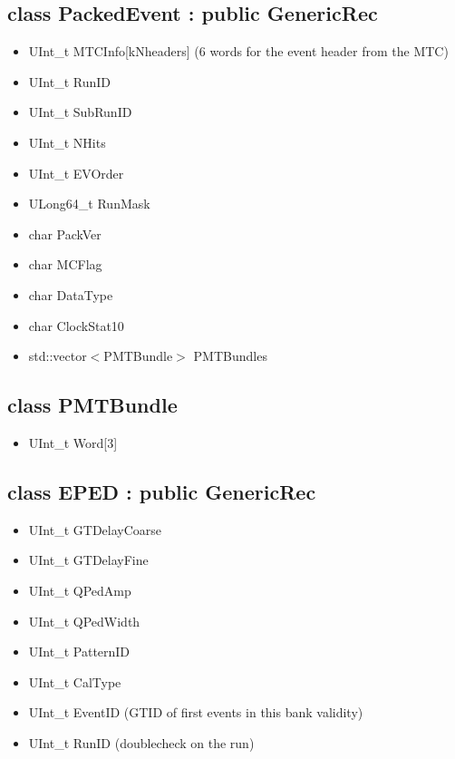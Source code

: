 \documentclass{article}
\begin{document}
\subsection{class PackedEvent : public GenericRec}
\begin{itemize}
\item UInt\_t MTCInfo[kNheaders] (6 words for the event header from the MTC)
\item UInt\_t RunID
\item UInt\_t SubRunID
\item UInt\_t NHits
\item UInt\_t EVOrder
\item ULong64\_t RunMask
\item char PackVer
\item char MCFlag
\item char DataType
\item char ClockStat10 
\item std::vector$<$PMTBundle$>$ PMTBundles
\end{itemize}

\subsection{class PMTBundle}
\begin{itemize}
\item UInt\_t Word[3] 
\end{itemize}

\subsection{class EPED : public GenericRec}
\begin{itemize}
\item UInt\_t GTDelayCoarse
\item UInt\_t GTDelayFine
\item UInt\_t QPedAmp
\item UInt\_t QPedWidth
\item UInt\_t PatternID
\item UInt\_t CalType
\item UInt\_t EventID (GTID of first events in this bank validity)
\item UInt\_t RunID (doublecheck on the run)
\end{itemize}
\end{document}
